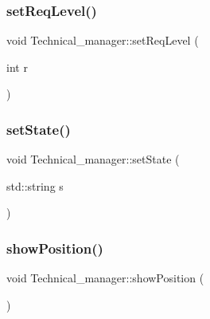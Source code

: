 \hypertarget{class_technical__manager_aeec07d833ce7ea6389ccb6ce4a01be6a}{}\label{class_technical__manager_aeec07d833ce7ea6389ccb6ce4a01be6a} 
\subsubsection{\texorpdfstring{set\+Req\+Level()}{setReqLevel()}}
{\footnotesize\ttfamily void Technical\+\_\+manager\+::set\+Req\+Level (\begin{DoxyParamCaption}\item[{int}]{r }\end{DoxyParamCaption})\hspace{0.3cm}{\ttfamily [inline]}}

\hypertarget{class_technical__manager_a2e562aa89e30f8dd64d3d9e907be18a5}{}\label{class_technical__manager_a2e562aa89e30f8dd64d3d9e907be18a5} 
\subsubsection{\texorpdfstring{set\+State()}{setState()}}
{\footnotesize\ttfamily void Technical\+\_\+manager\+::set\+State (\begin{DoxyParamCaption}\item[{std\+::string}]{s }\end{DoxyParamCaption})\hspace{0.3cm}{\ttfamily [inline]}}

\hypertarget{class_technical__manager_aab590839882d92cd7c00021500d3fddc}{}\label{class_technical__manager_aab590839882d92cd7c00021500d3fddc} 
\subsubsection{\texorpdfstring{show\+Position()}{showPosition()}}
{\footnotesize\ttfamily void Technical\+\_\+manager\+::show\+Position (\begin{DoxyParamCaption}{ }\end{DoxyParamCaption})\hspace{0.3cm}{\ttfamily [inline]}}



